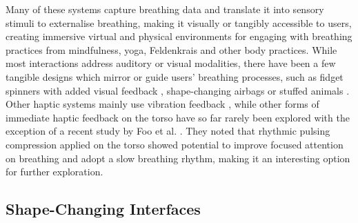 Many of these systems capture breathing data and translate it into sensory stimuli to externalise breathing, making it visually or tangibly accessible to users, creating immersive virtual and physical environments for engaging with breathing practices from mindfulness, yoga, Feldenkrais \cite{moran_exopranayama_2016, patibanda_life_2017, vidyarthi_sonic_2012, stahl_soma_2016, shamekhi_breathe_2018} and other body practices. While most interactions address auditory or visual modalities, there have been a few tangible designs which mirror or guide users' breathing processes, such as fidget spinners with added visual feedback \cite{liang_biofidget_2018}, shape-changing airbags \cite{yu_breathe_2015} or stuffed animals \cite{aslan_hold_2016}. Other haptic systems mainly use vibration feedback \cite{dijk_breathe_2011,bumatay_investigating_2017, miri_piv_2020}, while other forms of immediate haptic feedback on the torso have so far rarely been explored with the exception of a recent study by Foo et al. \cite{foo_soft_2020}. They noted that rhythmic pulsing compression applied on the torso showed potential to improve focused attention on breathing and adopt a slow breathing rhythm, making it an interesting option for further exploration.

\subsection{Shape-Changing Interfaces}


